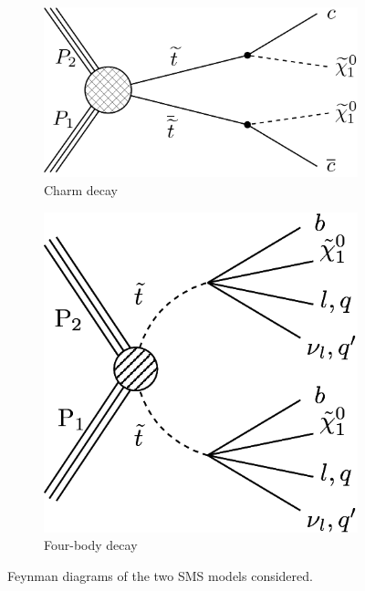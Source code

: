\begin{figure}[h!]
  \centering
  \hspace*{\fill}%
  \begin{subfigure}{0.35\textwidth}
    \includegraphics[width=\textwidth]{Figs/feynman/T2cc_feynman_new.pdf}
    \caption{Charm decay}
    \label{fig:t2cc_feyn}
  \end{subfigure}
  \hfill
  \begin{subfigure}{0.35\textwidth}
    \includegraphics[width=\textwidth]{Figs/feynman/T2DegenerateStop_feyn.png}
    \caption{Four-body decay}
    \label{fig:t2degen_feyn}
  \end{subfigure}
  \hspace*{\fill}%
  \caption{Feynman diagrams of the two SMS models considered.}
  \label{fig:model_feynman}
\end{figure}

